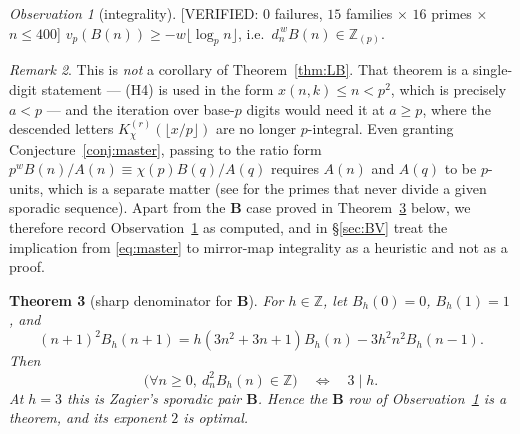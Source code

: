 \documentclass[11pt,reqno]{amsart}
\theoremstyle{plain}
\newtheorem{theorem}{Theorem}[section]
\theoremstyle{definition}
\theoremstyle{remark}
\newtheorem{remark}[theorem]{Remark}
\newtheorem{observation}[theorem]{Observation}
\newcommand{\Z}{\mathbb{Z}}
\newcommand{\Zp}{\Z_{(p)}}
\newcommand{\vp}{v_p}
\newcommand{\KK}[3]{K^{(#1)}_{#2}\!\left(#3\right)}
\newcommand{\VerifiedR}[1]{\textup{\textsf{[VERIFIED: #1]}}}
\numberwithin{equation}{section}
\begin{document}
\begin{observation}[integrality]\label{obs:integrality}
\VerifiedR{$0$ failures, $15$ families $\times$ $16$ primes $\times$ $n\le400$}
$\vp(B(n))\ge-w\lfloor\log_pn\rfloor$, i.e.\ $d_n^{\,w}B(n)\in\Zp$.
\end{observation}

\begin{remark}\label{rem:integrality}
This is \emph{not} a corollary of Theorem~\ref{thm:LB}. That theorem is a single-digit
statement --- (H4) is used in the form $x(n,k)\le n<p^2$, which is precisely $a<p$ --- and
the iteration over base-$p$ digits would need it at $a\ge p$, where the descended letters
$\KK r\chi{\lfloor x/p\rfloor}$ are no longer $p$-integral. Even granting
Conjecture~\ref{conj:master}, passing to the ratio form
$p^{w}B(n)/A(n)\equiv\chi(p)B(q)/A(q)$ requires $A(n)$ and $A(q)$ to be $p$-units, which is
a separate matter (see \cite{MalikStraub} for the primes that never divide a given
sporadic sequence). Apart from the $\mathbf B$ case proved in
Theorem~\ref{thm:Bden} below, we therefore record
Observation~\ref{obs:integrality} as computed, and
in \S\ref{sec:BV} treat the implication from \eqref{eq:master} to mirror-map integrality as
a heuristic and not as a proof.
\end{remark}

\begin{theorem}[sharp denominator for $\mathbf B$]\label{thm:Bden}
For $h\in\Z$, let $B_h(0)=0$, $B_h(1)=1$, and
\[
 (n+1)^2B_h(n+1)
 =h(3n^2+3n+1)B_h(n)-3h^2n^2B_h(n-1).
\]
Then
\[
 \bigl(\forall n\ge0,\ d_n^2B_h(n)\in\Z\bigr)
 \quad\Longleftrightarrow\quad 3\mid h.
\]
At $h=3$ this is Zagier's sporadic pair $\mathbf B$.  Hence the $\mathbf B$ row of
Observation~\ref{obs:integrality} is a theorem, and its exponent $2$ is optimal.
\end{theorem}
\end{document}
